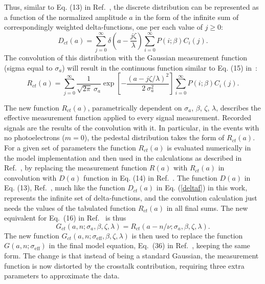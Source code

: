 Thus, similar to Eq. (13) in Ref.~\cite{DEGTIARENKO20171}, the discrete distribution can be represented as a function of the normalized amplitude $a$ in the form of the infinite sum of correspondingly weighted delta-functions, one per each value of $j \geq 0$:
\begin{equation}
\label{deltaf}
  D_{ct}(a)= \sum\limits_{j=0}^{\infty}
  \delta \left (a - \frac{j\zeta}{\lambda} \right )
   \sum\limits_{i=0}^{\infty} P(i;\beta) C_i(j) .
\end{equation}
The convolution of this distribution with the Gaussian measurement function (sigma equal to $\sigma_a$) will result in the continuous function similar to Eq. (15) in~\cite{DEGTIARENKO20171}:
\begin{equation}
\label{RCmodel}
  R_{ct}(a)= \sum\limits_{j=0}^{\infty} \frac{1}{\sqrt{2 \pi} \ \sigma_a} 
  \exp{\left [- \frac{(a - j \zeta / \lambda)^{2}}{2 
\ \sigma_a^{2}} \right ]}
   \sum\limits_{i=0}^{\infty} P(i;\beta) C_i(j) .
\end{equation}

The new function $R_{ct}(a)$, parametrically dependent on $\sigma_a$, $\beta$, $\zeta$, $\lambda$, describes the effective measurement function applied to every signal measurement. Recorded signals are the results of the convolution with it. In particular, in the events with no photoelectrons ($m=0$), the pedestal distribution takes the form of $R_{ct}(a)$. For a given set of parameters the function $R_{ct}(a)$ is evaluated numerically in the model implementation and then used in the calculations as described in Ref.~\cite{DEGTIARENKO20171}, by replacing the measurement function $R(a)$ with $R_{ct}(a)$ in convolution with $D(a)$ function in Eq. (14) in Ref.~\cite{DEGTIARENKO20171}. The function $D(a)$ in Eq. (13), Ref.~\cite{DEGTIARENKO20171}, much like the function $D_{ct}(a)$ in Eq. (\ref{deltaf}) in this work, represents the infinite set of delta-functions, and the convolution calculation just needs the values of the tabulated function $R_{ct}(a)$ in all final sums. The new equivalent for Eq.~(16) in Ref.~\cite{DEGTIARENKO20171} is thus
\begin{equation}
\label{GCmodel}
  G_{ct}(a,n;\sigma_a,\beta,\zeta,\lambda)= R_{ct}(a-n/\nu;\sigma_a,\beta,\zeta,\lambda).
\end{equation}
The new function $G_{ct}(a,n;\sigma_{\mathrm{eff}},\beta,\zeta,\lambda)$ is then used to replace the function $G(a,n;\sigma_{\mathrm{eff}})$ in the final model equation, Eq.~(36) in Ref.~\cite{DEGTIARENKO20171}, keeping the same form. The change is that instead of being a standard Gaussian, the measurement function is now distorted by the crosstalk contribution, requiring three extra parameters to approximate the data.

